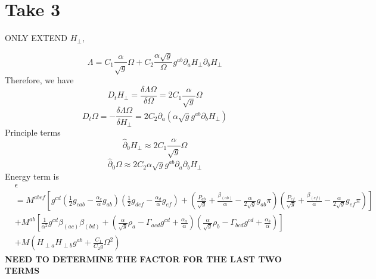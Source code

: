 \documentclass{article}
\begin{document}
\section{Take 3}
ONLY EXTEND $H_{\perp}$, 

\[
\Lambda = C_{1}\frac{\alpha}{\sqrt{g}}\Omega + C_{2}\frac{\alpha \sqrt{g}}{\Omega}g^{ab}\partial_{a}H_{\perp}\partial_{b}H_{\perp}
\]
Therefore, we have
\[
D_{t}H_{\perp} = \frac{\delta \Lambda\Omega}{\delta \Omega} = 2C_{1}\frac{\alpha}{\sqrt{g}}\Omega
\]
\[
D_{t}\Omega = -\frac{\delta \Lambda\Omega}{\delta H_{\perp}} = 2C_{2}\partial_{a}\left(\alpha \sqrt{g} g^{ab}\partial_{b}H_{\perp}\right)
\]
Principle terms
\[
{\hat \partial}_{0}H_{\perp} \approx 2C_{1}\frac{\alpha}{\sqrt{g}}\Omega
\]
\[
{\hat \partial}_{0}\Omega \approx 2C_{2}\alpha \sqrt{g}g^{ab}\partial_{a}\partial_{b}H_{\perp}
\]
Energy term is
\begin{align*}
& \epsilon \\
& = M^{abef}\left[g^{cd}\left(\frac{1}{2}g_{cab} - \frac{\alpha_{c}}{\alpha}g_{ab}\right)\left(\frac{1}{2}g_{def} - \frac{\alpha_{d}}{\alpha}g_{ef}\right) + \left(\frac{P_{ab}}{\sqrt{g}} + \frac{\beta_{(ab)}}{\alpha} - \frac{\alpha}{2\sqrt{g}}g_{ab}\pi \right)\left(\frac{P_{ef}}{\sqrt{g}} + \frac{\beta_{(ef)}}{\alpha} - \frac{\alpha}{2\sqrt{g}}g_{ef}\pi\right)\right]\\
& + M^{ab}\left[\frac{1}{\alpha^{2}}g^{cd}\beta_{(ac)}\beta_{(bd)} + \left(\frac{\alpha}{\sqrt{g}}\rho_{a} - \Gamma_{acd}g^{cd} + \frac{\alpha_{a}}{\alpha}\right)\left(\frac{\alpha}{\sqrt{g}}\rho_{b} - \Gamma_{bcd}g^{cd} + \frac{\alpha_{b}}{\alpha}\right)\right]\\
& + M\left(H_{\perp a}H_{\perp b}g^{ab} +\frac{C_{1}}{C_{2}g}\Omega^{2} \right)
\end{align*}
{\bf {\color{red} NEED TO DETERMINE THE FACTOR FOR THE LAST TWO TERMS}}
\end{document}
